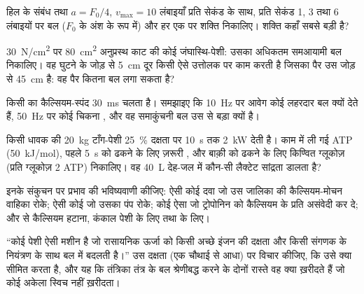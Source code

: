 \begin{exercise}[$\star\star$]\label{exo:b2:muscle-movement:7}
हिल के संबंध तथा $a = F_0/4$, $v_{\max} = 10$ लंबाइयाँ प्रति
सेकंड के साथ, प्रति सेकंड 1, 3 तथा 6 लंबाइयों पर बल ($F_0$ के अंश के रूप में)
और हर एक पर शक्ति निकालिए। शक्ति कहाँ सबसे बड़ी है?
\end{exercise}

\begin{exercise}[$\star\star$]\label{exo:b2:muscle-movement:8}
\qty{30}{N/cm^2} पर \qty{80}{cm^2} अनुप्रस्थ काट की कोई जंघास्थि-पेशी:
उसका अधिकतम समआयामी बल निकालिए। वह घुटने के जोड़ से \qty{5}{cm}
दूर किसी ऐसे उत्तोलक पर काम करती है जिसका पैर उस जोड़ से \qty{45}{cm} है:
वह पैर कितना बल लगा सकता है?
\end{exercise}

\begin{exercise}[$\star\star$]\label{exo:b2:muscle-movement:9}
किसी  का कैल्सियम-स्पंद \qty{30}{ms} चलता है। समझाइए कि
\qty{10}{Hz} पर आवेग कोई लहरदार बल क्यों देते हैं, \qty{50}{Hz} पर कोई चिकना
, और वह समाकुंचनी बल उस  से बड़ा क्यों है।
\end{exercise}

\begin{exercise}[$\star\star\star$]\label{exo:b2:muscle-movement:10}
किसी धावक की \qty{20}{kg} टाँग-पेशी \qty{25}{\%} दक्षता पर \qty{10}{s} तक
\qty{2}{kW} देती है। काम में ली गई ATP (\qty{50}{kJ/mol}),
पहले \qty{5}{s} को ढकने के लिए ज़रूरी , और
बाक़ी को ढकने के लिए किण्वित ग्लूकोज़ (प्रति ग्लूकोज़ 2 ATP) निकालिए। वह
\qty{40}{L} देह-जल में कौन-सी लैक्टेट सांद्रता डालता है?
\end{exercise}

\begin{exercise}[$\star\star\star$]\label{exo:b2:muscle-movement:11}
इनके संकुचन पर प्रभाव की भविष्यवाणी कीजिए: ऐसी कोई दवा जो उस
जालिका की कैल्सियम-मोचन वाहिका रोके; ऐसी कोई जो उसका पंप रोके; कोई
ऐसा  जो ट्रोपोनिन को कैल्सियम के प्रति असंवेदी कर दे; और  से
कैल्सियम हटाना, कंकाल पेशी के लिए तथा  के लिए।
\end{exercise}

\begin{exercise}[$\star\star\star$]\label{exo:b2:muscle-movement:12}
``कोई पेशी ऐसी मशीन है जो रासायनिक ऊर्जा को किसी अच्छे इंजन की दक्षता
और किसी संगणक के नियंत्रण के साथ बल में बदलती है।'' उस दक्षता
(एक चौथाई से आधा) पर विचार कीजिए, कि उसे क्या सीमित करता है, और यह कि
तंत्रिका तंत्र के बल श्रेणीबद्ध करने के दोनों रास्ते वह क्या ख़रीदते हैं
जो कोई अकेला स्विच नहीं ख़रीदता।
\end{exercise}

